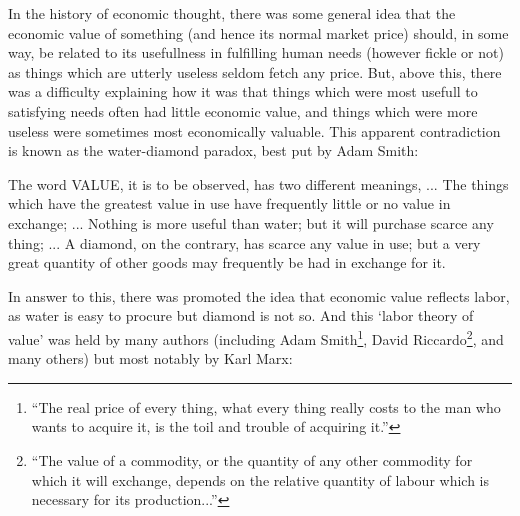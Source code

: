 In the history of economic thought, there was some general idea that the economic value of something (and hence its normal market price) should, in some way, be related to its usefullness in fulfilling human needs (however fickle or not) as things which are utterly useless seldom fetch any price.
But, above this, there was a difficulty explaining how it was that things which were most usefull to satisfying needs often had little economic value, and things which were more useless were sometimes most economically valuable. This apparent contradiction is known as the water-diamond paradox, best put by Adam Smith:


\begin{displayquote}
The word VALUE, it is to be observed, has two different meanings, ... The things which have the greatest value in use have frequently little or no value in exchange; ... Nothing is more useful than water; but it will purchase scarce any thing; ... A diamond, on the contrary, has scarce any value in use; but a very great quantity of other goods may frequently be had in exchange for it.\cite{Smith1Gutenberg}
\end{displayquote}

In answer to this, there was promoted the idea that economic value reflects labor, as water is easy to procure but diamond is not so.
And this `labor theory of value' was held by many authors (including Adam Smith\footnote{``The real price of every thing, what every thing really costs to the man who wants to acquire it, is the toil and trouble of acquiring it.''\cite{Smith1Gutenberg}}, David Riccardo\footnote{``The value of a commodity, or the quantity of any other commodity for which it will exchange, depends on the relative quantity of labour which is necessary for its production...''\cite[Section 1, Chapter 1]{Riccardo1Gutenberg}}, and many others) but most notably by Karl Marx:

